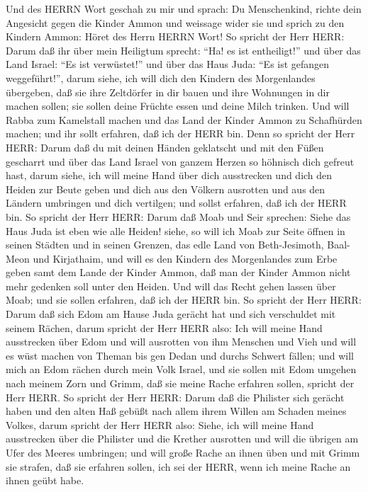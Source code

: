  Und des HERRN Wort geschah zu mir und sprach: 
Du Menschenkind, richte dein Angesicht gegen die Kinder Ammon und
weissage wider sie  und sprich zu den Kindern Ammon: Höret
des Herrn HERRN Wort! So spricht der Herr HERR: Darum daß ihr über mein
Heiligtum sprecht: ``Ha! es ist entheiligt!'' und über das Land Israel:
``Es ist verwüstet!'' und über das Haus Juda: ``Es ist gefangen
weggeführt!'',  darum siehe, ich will dich den Kindern des
Morgenlandes übergeben, daß sie ihre Zeltdörfer in dir bauen und ihre
Wohnungen in dir machen sollen; sie sollen deine Früchte essen und deine
Milch trinken.  Und will Rabba zum Kamelstall machen und das
Land der Kinder Ammon zu Schafhürden machen; und ihr sollt erfahren, daß
ich der HERR bin.  Denn so spricht der Herr HERR: Darum daß
du mit deinen Händen geklatscht und mit den Füßen gescharrt und über das
Land Israel von ganzem Herzen so höhnisch dich gefreut hast,
 darum siehe, ich will meine Hand über dich ausstrecken und
dich den Heiden zur Beute geben und dich aus den Völkern ausrotten und
aus den Ländern umbringen und dich vertilgen; und sollst erfahren, daß
ich der HERR bin.  So spricht der Herr HERR: Darum daß Moab
und Seir sprechen: Siehe das Haus Juda ist eben wie alle Heiden!
 siehe, so will ich Moab zur Seite öffnen in seinen Städten
und in seinen Grenzen, das edle Land von Beth-Jesimoth, Baal-Meon und
Kirjathaim,  und will es den Kindern des Morgenlandes zum
Erbe geben samt dem Lande der Kinder Ammon, daß man der Kinder Ammon
nicht mehr gedenken soll unter den Heiden.  Und will das
Recht gehen lassen über Moab; und sie sollen erfahren, daß ich der HERR
bin.  So spricht der Herr HERR: Darum daß sich Edom am
Hause Juda gerächt hat und sich verschuldet mit seinem Rächen,
 darum spricht der Herr HERR also: Ich will meine Hand
ausstrecken über Edom und will ausrotten von ihm Menschen und Vieh und
will es wüst machen von Theman bis gen Dedan und durchs Schwert fällen;
 und will mich an Edom rächen durch mein Volk Israel, und
sie sollen mit Edom umgehen nach meinem Zorn und Grimm, daß sie meine
Rache erfahren sollen, spricht der Herr HERR.  So spricht
der Herr HERR: Darum daß die Philister sich gerächt haben und den alten
Haß gebüßt nach allem ihrem Willen am Schaden meines Volkes,
 darum spricht der Herr HERR also: Siehe, ich will meine
Hand ausstrecken über die Philister und die Krether ausrotten und will
die übrigen am Ufer des Meeres umbringen;  und will große
Rache an ihnen üben und mit Grimm sie strafen, daß sie erfahren sollen,
ich sei der HERR, wenn ich meine Rache an ihnen geübt habe.

